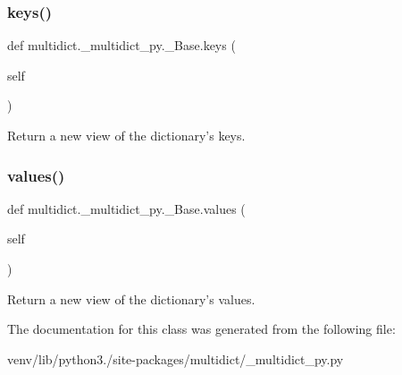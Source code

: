 \subsubsection{\texorpdfstring{keys()}{keys()}}
{\footnotesize\ttfamily def multidict.\+\_\+multidict\+\_\+py.\+\_\+\+Base.\+keys (\begin{DoxyParamCaption}\item[{}]{self }\end{DoxyParamCaption})}

\begin{DoxyVerb}Return a new view of the dictionary's keys.\end{DoxyVerb}
 \mbox{\label{classmultidict_1_1__multidict__py_1_1___base_af3786e3d55228236478fe4fbe0d3c497}} 
\subsubsection{\texorpdfstring{values()}{values()}}
{\footnotesize\ttfamily def multidict.\+\_\+multidict\+\_\+py.\+\_\+\+Base.\+values (\begin{DoxyParamCaption}\item[{}]{self }\end{DoxyParamCaption})}

\begin{DoxyVerb}Return a new view of the dictionary's values.\end{DoxyVerb}
 

The documentation for this class was generated from the following file\+:\begin{DoxyCompactItemize}
\item 
venv/lib/python3./site-\/packages/multidict/\+\_\+multidict\+\_\+py.\+py\end{DoxyCompactItemize}
